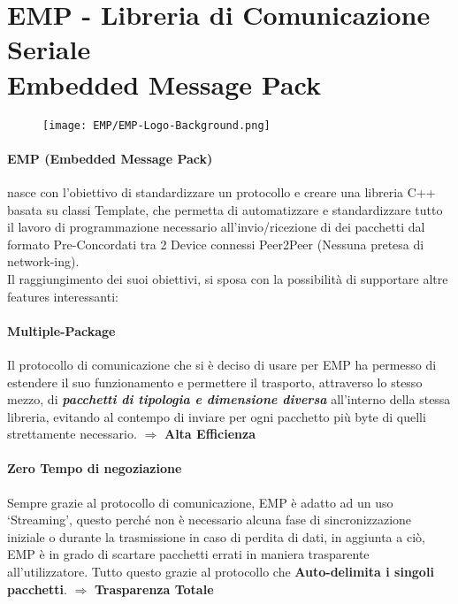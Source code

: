 \newpage

\section*{EMP - Libreria di Comunicazione Seriale\\Embedded Message Pack }\label{EMP}

\begin{figure}[h]
	\centering
	\texttt{[image: EMP/EMP-Logo-Background.png]}
\end{figure}
\paragraph{EMP (Embedded Message Pack)} nasce con l’obiettivo di standardizzare un protocollo e creare una libreria C++ basata su classi Template, che permetta di automatizzare e standardizzare tutto il lavoro di programmazione necessario all’invio/ricezione di dei pacchetti dal formato Pre-Concordati tra 2 Device connessi Peer2Peer (Nessuna pretesa di network-ing).\\
Il raggiungimento dei suoi obiettivi, si sposa con la possibilità di supportare altre features interessanti:

\paragraph{Multiple-Package} Il protocollo di comunicazione che si è deciso di usare per EMP ha permesso di estendere il suo funzionamento e permettere il trasporto, attraverso lo stesso mezzo, di \textit{\textbf{pacchetti di tipologia e dimensione diversa}} all’interno della stessa libreria, evitando al contempo di inviare per ogni pacchetto più byte di quelli strettamente necessario. $\Rightarrow$ \textbf{Alta Efficienza}

\paragraph{Zero Tempo di negoziazione} Sempre grazie al protocollo di comunicazione, EMP è adatto ad un uso ‘Streaming’, questo perché non è necessario alcuna fase di sincronizzazione iniziale o durante la trasmissione in caso di perdita di dati, in aggiunta a ciò, EMP è in grado di scartare pacchetti errati in maniera trasparente all’utilizzatore. Tutto questo grazie al protocollo che \textbf{Auto-delimita i singoli pacchetti}. $\Rightarrow$ \textbf{Trasparenza Totale}

